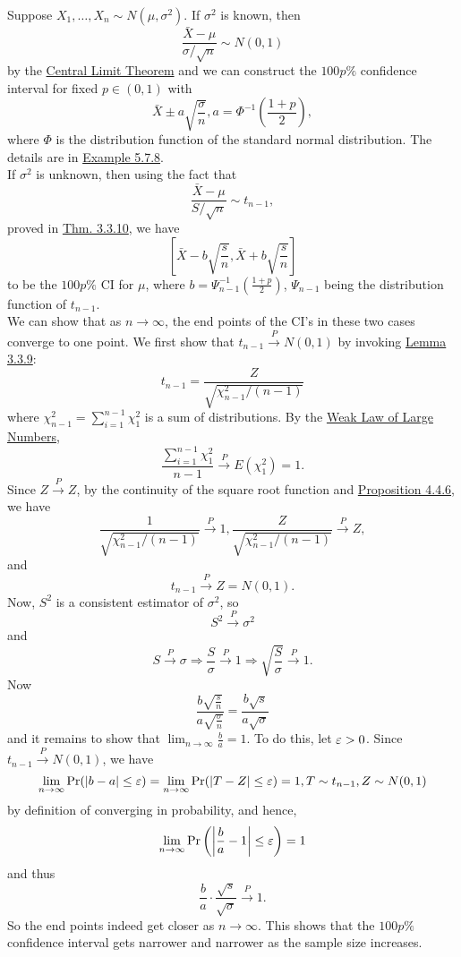 \documentclass[11pt,fleqn]{book} %
\begin{document}
\begin{example} \label{eg:813}
Suppose \(X_1, \ldots, X_n \sim N(\mu, \sigma^2)\). If \(\sigma^2\) is known, then
\[
\frac{\bar{X} - \mu}{\sigma/\sqrt{n}} \sim N(0, 1)
\]
by the \hyperref[thm:443]{Central Limit Theorem} and we can construct the \(100p\%\) confidence interval for fixed \(p \in (0, 1)\) with
\[
\bar{X} \pm a\sqrt{\frac{\sigma}{n}}, a = \Phi^{-1}\left(\frac{1 + p}{2}\right),
\]
where \(\Phi\) is the distribution function of the standard normal distribution. The details are in \hyperref[eg:578]{Example 5.7.8}. \\
\indent If \(\sigma^2\) is unknown, then using the fact that
\[
\frac{\bar{X} - \mu}{S / \sqrt{n}} \sim t_{n-1},
\]
proved in \hyperref[thm:3310]{Thm. 3.3.10}, we have
\[
\left[\bar{X} - b\sqrt{\frac{s}{n}}, \bar{X} + b\sqrt{\frac{s}{n}}\right]
\]
to be the \(100p\%\) CI for \(\mu\), where \(b = \Psi^{-1}_{n-1}\left(\frac{1 + p}{2}\right)\), \(\Psi_{n-1}\) being the distribution function of \(t_{n-1}\). \\
\indent We can show that as \(n\rightarrow\infty\), the end points of the CI's in these two cases converge to one point. We first show that \(t_{n-1} \xrightarrow{P} N(0, 1)\) by invoking \hyperref[lemma:339]{Lemma 3.3.9}:
\[
t_{n-1} = \frac{Z}{\sqrt{\chi^2_{n-1} / (n - 1)}}
\]
where \(\chi^2_{n-1} = \sum_{i=1}^{n-1}\chi^2_1\) is a sum of distributions. By the \hyperref[thm:431]{Weak Law of Large Numbers}, 
\[
\frac{\sum_{i=1}^{n-1}\chi^2_1}{n - 1} \xrightarrow{P} E(\chi^2_1) = 1.
\]
\indent Since \(Z \xrightarrow{P} Z\), by the continuity of the square root function and \hyperref[prop:446]{Proposition 4.4.6}, we have
\[
\frac{1}{\sqrt{\chi^2_{n-1}/(n-1)}} \xrightarrow{P} 1, \frac{Z}{\sqrt{\chi^2_{n-1}/(n-1)}} \xrightarrow{P} Z,
\]
and
\[
t_{n-1} \xrightarrow{P} Z = N(0, 1).
\]
\indent Now, \(S^2\) is a consistent estimator of \(\sigma^2\), so
\[
S^2 \xrightarrow{P} \sigma^2
\]
and
\[
S \xrightarrow{P} \sigma \Rightarrow \frac{S}{\sigma} \xrightarrow{P} 1 \Rightarrow \sqrt{\frac{S}{\sigma}} \xrightarrow{P} 1.
\]
\indent Now
\[
\frac{b\sqrt{\frac{s}{n}}}{a\sqrt{\frac{\sigma}{n}}} = \frac{b\sqrt{s}}{a\sqrt{\sigma}}
\]
and it remains to show that \(\lim_{n\rightarrow\infty}\frac{b}{a} = 1\). To do this, let \(\varepsilon > 0\). Since \(t_{n-1} \xrightarrow{P} N(0, 1)\), we have
\[
\lim_{n\rightarrow\infty} \Pr(|b - a| \leq \varepsilon) = \lim_{n\rightarrow\infty}\Pr(|T - Z| \leq \varepsilon) = 1, T \sim t_{n-1}, Z\sim N(0, 1)
\]
by definition of converging in probability, and hence,
\[
\lim_{n\rightarrow\infty}\Pr\left(\left|\frac{b}{a} - 1\right| \leq \varepsilon\right) = 1
\]
and thus
\[
\frac{b}{a}\cdot\frac{\sqrt{s}}{\sqrt{\sigma}} \xrightarrow{P} 1.
\]
\indent So the end points indeed get closer as \(n\rightarrow\infty\). This shows that the \(100p\%\) confidence interval gets narrower and narrower as the sample size increases.
\end{example}
\end{document}

